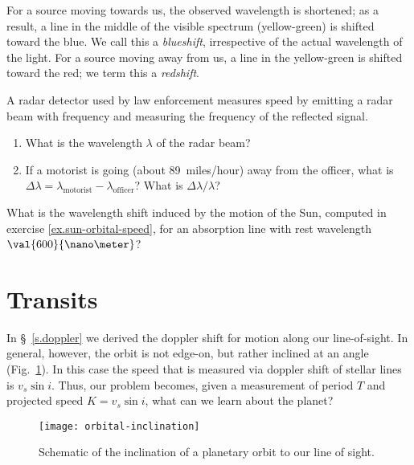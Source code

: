 For a source moving towards us, the observed wavelength is shortened; as a result, a line in the middle of the visible spectrum (yellow-green) is shifted toward the blue.  We call this a \emph{blueshift}, irrespective of the actual wavelength of the light.  For a source moving away from us, a line in the yellow-green is shifted toward the red; we term this a \emph{redshift}.

\begin{exercisebox}
A radar detector used by law enforcement measures speed by emitting a radar beam with frequency  and measuring the frequency of the reflected signal.
\begin{enumerate}
\item What is the wavelength $\lambda$ of the radar beam?
\item If a motorist is going  (about 89~miles/hour) away from the officer, what is $\Delta\lambda = \lambda_{\mathrm{motorist}} - \lambda_{\mathrm{officer}}$? What is $\Delta\lambda/\lambda$?
\end{enumerate}
\end{exercisebox}


\begin{exercisebox}
	What is the wavelength shift induced by the motion of the Sun, computed in exercise \ref{ex.sun-orbital-speed}, for an absorption line with rest wavelength $\val{600}{\nano\meter}$?
\end{exercisebox}

\section{Transits}

In \S~\ref{s.doppler} we derived the doppler shift for motion along our line-of-sight.
In general, however, the orbit is not edge-on, but rather inclined at an angle (Fig.~\ref{f.orbital-inclination}).
In this case the speed that is measured via doppler shift of stellar lines is $v_{s}\sin i$.  Thus, our problem becomes, given a measurement of period $T$ and projected speed $K = v_{s}\sin i$, what can we learn about the planet?

\begin{figure}[ht]
\texttt{[image: orbital-inclination]}
\caption[Schematic of the inclination of a planetary orbit]{Schematic of the inclination of a planetary orbit to our line of sight.}
\label{f.orbital-inclination}
\end{figure}

